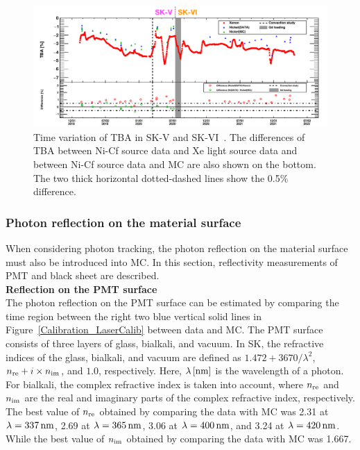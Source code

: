 \begin{figure}[tbp]
	\centering
	\includegraphics[width=16cm]{Figures/Calibration/TBA_SK56}
	\caption[Time variation of TBA in SK-V and SK-VI]{
	Time variation of TBA in SK-V and SK-VI~\cite{SK6LOWEdata}.
	The differences of TBA between Ni-Cf source data and Xe light source data and between Ni-Cf source data and MC are also shown on the bottom.
	The two thick horizontal dotted-dashed lines show the 0.5\% difference.
	}\label{Calibration_TBA_SK56}
\end{figure}

\subsubsection{Photon reflection on the material surface}
\vs\hs
When considering photon tracking, the photon reflection on the material surface must also be introduced into MC.
In this section, reflectivity measurements of PMT and black sheet are described.\\

\textbf{Reflection on the PMT surface}\\
\hs
The photon reflection on the PMT surface can be estimated by comparing the time region between the right two blue vertical solid lines in Figure~\ref{Calibration_LaserCalib} between data and MC.
The PMT surface consists of three layers of glass, bialkali, and vacuum.
In SK, the refractive indices of the glass, bialkali, and vacuum are defined as $1.472 + 3670/\lambda^{2}$, $n_{\rm re} + i \times n_{\rm im}$, and $1.0$, respectively.
Here, $\lambda\,[{\rm nm}]$ is the wavelength of a photon.
For bialkali, the complex refractive index is taken into account, where $n_{\rm re}$ and $n_{\rm im}$ are the real and imaginary parts of the complex refractive index, respectively.
The best value of $n_{\rm re}$ obtained by comparing the data with MC was 2.31 at $\lambda = 337\,{\rm nm}$, 2.69 at $\lambda = 365\,{\rm nm}$, 3.06 at $\lambda = 400\,{\rm nm}$, and 3.24 at $\lambda = 420\,{\rm nm}$.
While the best value of $n_{\rm im}$ obtained by comparing the data with MC was 1.667.\\

